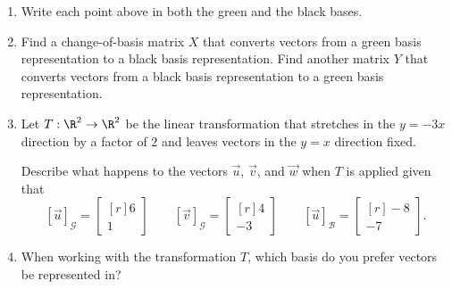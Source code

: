 \documentclass{problemset}
\newcommand{\mat}[1]{\begin{bmatrix*}[r]#1\end{bmatrix*}}
\begin{document}
\begin{iola}
\begin{enumerate}
	\item Write each point above in both the green and the black bases.
	\item Find a change-of-basis matrix $X$ that converts vectors from
		a green basis representation to a black basis representation. Find
		another matrix $Y$ that converts vectors from a black basis representation
		to a green basis representation.
	\item Let $T:\R^2\to\R^2$ be the linear transformation that stretches in the $y=-3x$ direction
		by a factor of $2$ and leaves vectors in the $y=x$ direction fixed.

		Describe what happens to the vectors $\vec u$, $\vec v$, and $\vec w$ when
		$T$ is applied given that 
		\[
			[\vec u]_{\mathcal G} = \mat{6\\1} \qquad 
			[\vec v]_{\mathcal G} = \mat{4\\-3} \qquad 
			[\vec u]_{\mathcal B} = \mat{-8\\-7}.
		\]
	\item When working with the transformation $T$, which basis do you prefer vectors be
		represented in?
\end{enumerate}
\end{iola}
\end{document}
